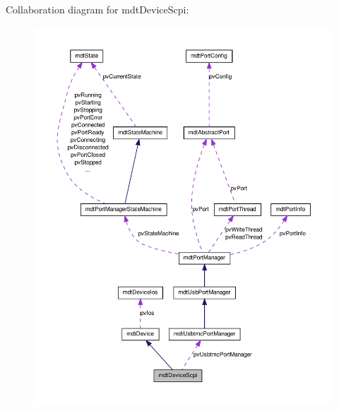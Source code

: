 Collaboration diagram for mdtDeviceScpi:\nopagebreak
\begin{figure}[H]
\begin{center}
\leavevmode
\includegraphics[width=400pt]{classmdt_device_scpi__coll__graph}
\end{center}
\end{figure}
